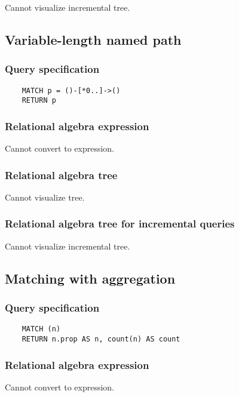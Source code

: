 	Cannot visualize incremental tree.
	\subsection{Variable-length named path}

	\subsubsection*{Query specification}

	\begin{lstlisting}
	MATCH p = ()-[*0..]->()
	RETURN p
	\end{lstlisting}


	\subsubsection*{Relational algebra expression}

	Cannot convert to expression.

	\subsubsection*{Relational algebra tree}

	Cannot visualize tree.

	\subsubsection*{Relational algebra tree for incremental queries}

	Cannot visualize incremental tree.
	\subsection{Matching with aggregation}

	\subsubsection*{Query specification}

	\begin{lstlisting}
	MATCH (n)
	RETURN n.prop AS n, count(n) AS count
	\end{lstlisting}


	\subsubsection*{Relational algebra expression}

	Cannot convert to expression.


